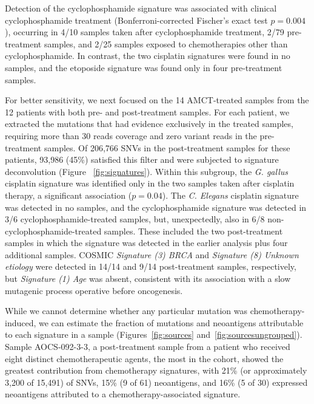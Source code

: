 Detection of the cyclophosphamide signature was associated with clinical cyclophosphamide treatment (Bonferroni-corrected Fischer's exact test $p = 0.004$), occurring in 4/10 samples taken after cyclophosphamide treatment, 2/79 pre-treatment samples, and 2/25 samples exposed to chemotherapies other than cyclophosphamide. In contrast, the two cisplatin signatures were found in no samples, and the etoposide signature was found only in four pre-treatment samples.


For better sensitivity, we next focused on the 14 AMCT-treated samples from the 12 patients with both pre- and post-treatment samples. For each patient, we extracted the mutations that had evidence exclusively in the treated samples, requiring more than 30 reads coverage and zero variant reads in the pre-treatment samples. Of 206,766 SNVs in the post-treatment samples for these patients, 93,986 (45\%) satisfied this filter and were subjected to signature deconvolution (Figure ~\ref{fig:signatures}). Within this subgroup, the \textit{G. gallus} cisplatin signature was identified only in the two samples taken after cisplatin therapy, a significant association ($p = 0.04$). The \textit{C. Elegans} cisplatin signature was detected in no samples, and the cyclophosphamide signature was detected in 3/6 cyclophosphamide-treated samples, but, unexpectedly, also in 6/8 non-cyclophosphamide-treated samples. These included the two post-treatment samples in which the signature was detected in the earlier analysis plus four additional samples. COSMIC \textit{Signature (3) BRCA} and \textit{Signature (8) Unknown etiology} were detected in 14/14 and 9/14 post-treatment samples, respectively, but \textit{Signature (1) Age} was absent, consistent with its association with a slow mutagenic process operative before oncogenesis.

While we cannot determine whether any particular mutation was chemotherapy-induced, we can estimate the fraction of mutations and neoantigens attributable to each signature in a sample (Figures~\ref{fig:sources} and~\ref{fig:sourcesungrouped}). Sample AOCS-092-3-3, a post-treatment sample from a patient who received eight distinct chemotherapeutic agents, the most in the cohort, showed the greatest contribution from chemotherapy signatures, with 21\% (or approximately 3,200 of 15,491) of SNVs, 15\% (9 of 61) neoantigens, and 16\% (5 of 30) expressed neoantigens attributed to a chemotherapy-associated signature.

